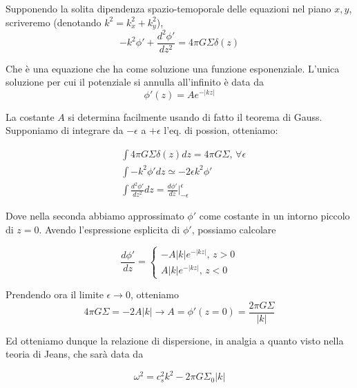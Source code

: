 \documentclass{report}
\begin{document}
Supponendo la solita dipendenza spazio-temoporale delle equazioni nel piano $x, y$, scriveremo (denotando $k^2 = k_x^2 + k_y^2$), 
\begin{equation}
    -k^2\phi' + \frac{d^2\phi'}{dz^2} = 4\pi G \Sigma \delta(z)
\end{equation}

Che è una equazione che ha come soluzione una funzione esponenziale. L'unica soluzione per cui il potenziale si annulla all'infinito è data da 
\begin{equation}
    \phi'(z) = Ae^{-|kz|}
\end{equation}

La costante $A$ si determina facilmente usando di fatto il teorema di Gauss. Supponiamo di integrare da $-\epsilon$ a $+\epsilon$ l'eq. di possion, otteniamo: 

\begin{align}
    &\int 4\pi G \Sigma\delta(z) dz= 4\pi G \Sigma, \,  \forall \epsilon \\  
    & \int -k^2\phi' dz\simeq -2\epsilon k^2\phi' \\
    & \int \frac{d^2\phi'}{dz^2}dz = \frac{d\phi'}{dz}\biggr|^\epsilon_{-\epsilon}
\end{align}

Dove nella seconda abbiamo approssimato $\phi'$ come costante in un intorno piccolo di $z=0$. Avendo l'espressione esplicita di $\phi'$, possiamo calcolare 

\begin{equation}
\frac{d\phi'}{dz} = 
\begin{cases}
    -A|k|e^{-|kz|}, \, z>0 \\ A|k|e^{-|kz|}, \, z<0 
\end{cases}
\end{equation}

Prendendo ora il limite $\epsilon \rightarrow0$, otteniamo 
\begin{equation}
    4\pi G \Sigma = -2A|k| \rightarrow A = \phi'(z=0) = \frac{2\pi G\Sigma}{|k|}
\end{equation}

Ed otteniamo dunque la relazione di dispersione, in analgia a quanto visto nella teoria di Jeans, che sarà data da 
\begin{tcolorbox}[colback=myg!15, colframe=black, boxrule=1pt]
\begin{equation}
    \omega^2 = c_s^2 k^2 -2\pi G \Sigma_0 |k|
\end{equation}
\end{tcolorbox}
\end{document}
